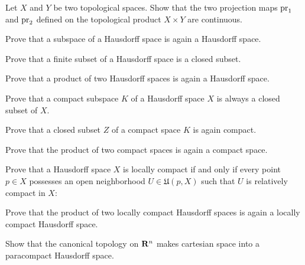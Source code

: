 \begin{xca}
  Let $X$ and $Y$ be two topological spaces. Show that the two projection maps
  $\mathrm{pr}_1$ and $\mathrm{pr}_2$ defined on the topological product $X \times Y$ are
  continuous.
\end{xca}

\begin{xca}
  Prove that a subspace of a Hausdorff space is again a Hausdorff space.
\end{xca}

\begin{xca}
  Prove that a finite subset of a Hausdorff space is a closed subset.
\end{xca}

\begin{xca}
  Prove that a product of two Hausdorff spaces is again a Hausdorff space.
\end{xca}

\begin{xca}
  Prove that a compact subspace $K$ of a Hausdorff space $X$ is always a closed subset
  of $X$.
\end{xca}

\begin{xca}
  Prove that a closed subset $Z$ of a compact space $K$ is again compact.
\end{xca}

\begin{xca}
  Prove that the product of two compact spaces is again a compact space.
\end{xca}

\begin{xca}
  Prove that a Hausdorff space $X$ is locally compact if and only if every point
  $p \in X$ possesses an open neighborhood $U \in \mathfrak U(p, X)$ such that
  $U$ is relatively compact in $X$:
\end{xca}

\begin{xca}
  Prove that the product of two locally compact Hausdorff spaces is again a
  locally compact Hausdorff space.
\end{xca}

\begin{xca}
  Show that the canonical topology on $\mathbf{R}^n$ makes cartesian space into
  a paracompact Hausdorff space.
\end{xca}

